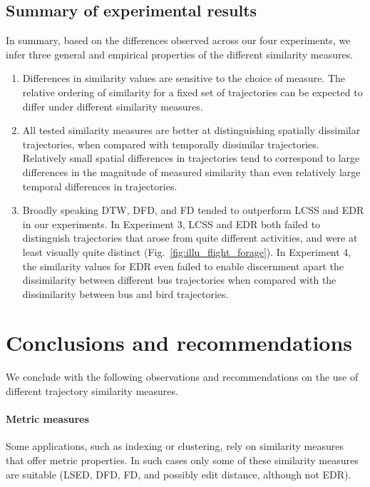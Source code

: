 \documentclass[10pt,letterpaper]{article}
\begin{document}
\subsection{Summary of experimental results}

In summary, based on the differences observed across our four experiments, we infer three general and empirical properties of the different similarity measures.

\begin{enumerate}

\item Differences in similarity values are sensitive to the choice of measure. The relative ordering of similarity  for a fixed set of trajectories can be expected to differ under different similarity measures. 

\item All tested similarity measures are better at distinguishing spatially dissimilar trajectories, when compared with temporally dissimilar trajectories. Relatively small spatial differences in trajectories tend to correspond to large differences in the magnitude of  measured similarity than even  relatively large temporal differences in trajectories. 

\item Broadly speaking DTW, DFD, and FD tended to outperform LCSS and EDR in our experiments.  In Experiment 3, LCSS and EDR both failed to distinguish trajectories that arose from quite different activities, and were at least visually quite distinct (Fig.~\ref{fig:illu_flight_forage}). In Experiment 4, the similarity values for EDR even failed to enable discernment apart the dissimilarity between different bus trajectories when compared with the dissimilarity between bus and bird trajectories. 
\end{enumerate}
 	
\section{Conclusions and recommendations}
\label{sec:discussion}

We conclude with the following observations and recommendations on the use of different trajectory similarity measures. 

\paragraph{Metric measures}  Some applications, such as indexing or clustering, rely on similarity measures that offer metric properties. In such cases only some of these similarity measures are suitable (LSED, DFD, FD, and possibly edit distance, although not EDR). 
 	
\end{document}
